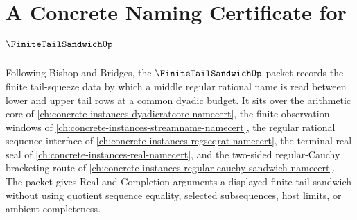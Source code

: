 \chapter{A Concrete Naming Certificate for $\FiniteTailSandwichUp$}
\label{ch:concrete-instances-finite-tail-sandwich-namecert}

Following Bishop and Bridges, the $\FiniteTailSandwichUp$ packet records the finite tail-squeeze data by which a middle regular rational name is read between lower and upper tail rows at a common dyadic budget. It sits over the arithmetic core of \autoref{ch:concrete-instances-dyadicratcore-namecert}, the finite observation windows of \autoref{ch:concrete-instances-streamname-namecert}, the regular rational sequence interface of \autoref{ch:concrete-instances-regseqrat-namecert}, the terminal real seal of \autoref{ch:concrete-instances-real-namecert}, and the two-sided regular-Cauchy bracketing route of \autoref{ch:concrete-instances-regular-cauchy-sandwich-namecert}. The packet gives Real-and-Completion arguments a displayed finite tail sandwich without using quotient sequence equality, selected subsequences, host limits, or ambient completeness.

